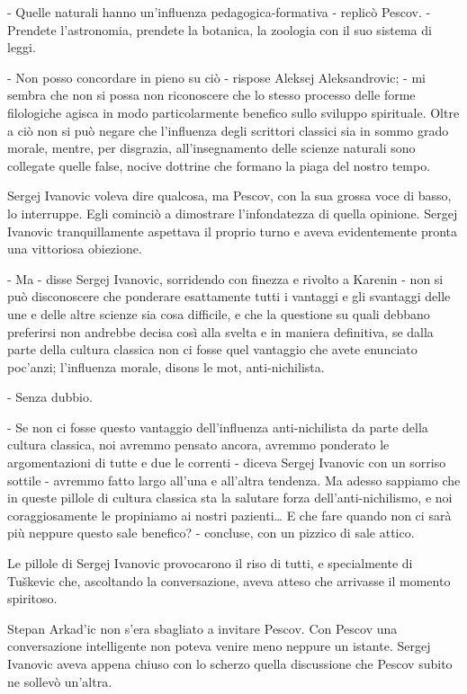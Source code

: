 - Quelle naturali hanno un'influenza pedagogica-formativa - replicò Pescov. - Prendete l'astronomia, prendete la botanica, la zoologia con il suo sistema di leggi. 

- Non posso concordare in pieno su ciò - rispose Aleksej Aleksandrovic; - mi sembra che non si possa non riconoscere che lo stesso processo delle forme filologiche agisca in modo particolarmente benefico sullo sviluppo spirituale. Oltre a ciò non si può negare che l'influenza degli scrittori classici sia in sommo grado morale, mentre, per disgrazia, all'insegnamento delle scienze naturali sono collegate quelle false, nocive dottrine che formano la piaga del nostro tempo. 

Sergej Ivanovic voleva dire qualcosa, ma Pescov, con la sua grossa voce di basso, lo interruppe. Egli cominciò a dimostrare l'infondatezza di quella opinione. Sergej Ivanovic tranquillamente aspettava il proprio turno e aveva evidentemente pronta una vittoriosa obiezione. 

- Ma - disse Sergej Ivanovic, sorridendo con finezza e rivolto a Karenin - non si può disconoscere che ponderare esattamente tutti i vantaggi e gli svantaggi delle une e delle altre scienze sia cosa difficile, e che la questione su quali debbano preferirsi non andrebbe decisa così alla svelta e in maniera definitiva, se dalla parte della cultura classica non ci fosse quel vantaggio che avete enunciato poc'anzi; l'influenza morale, disons le mot, anti-nichilista. 

- Senza dubbio. 

- Se non ci fosse questo vantaggio dell'influenza anti-nichilista da parte della cultura classica, noi avremmo pensato ancora, avremmo ponderato le argomentazioni di tutte e due le correnti - diceva Sergej Ivanovic con un sorriso sottile - avremmo fatto largo all'una e all'altra tendenza. Ma adesso sappiamo che in queste pillole di cultura classica sta la salutare forza dell'anti-nichilismo, e noi coraggiosamente le propiniamo ai nostri pazienti\ldots{} E che fare quando non ci sarà più neppure questo sale benefico? - concluse, con un pizzico di sale attico. 

Le pillole di Sergej Ivanovic provocarono il riso di tutti, e specialmente di Tuškevic che, ascoltando la conversazione, aveva atteso che arrivasse il momento spiritoso. 

Stepan Arkad'ic non s'era sbagliato a invitare Pescov. Con Pescov una conversazione intelligente non poteva venire meno neppure un istante. Sergej Ivanovic aveva appena chiuso con lo scherzo quella discussione che Pescov subito ne sollevò un'altra. 

